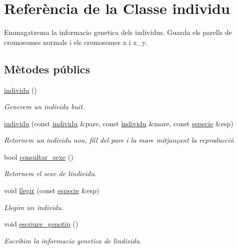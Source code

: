 \hypertarget{classindividu}{}\section{Referència de la Classe individu}
\label{classindividu}


Emmagatzema la informacio genetica dels individus. Guarda els parells de cromosomes normals i els cromosomes x i x\+\_\+y.  


\subsection*{Mètodes públics}
\begin{DoxyCompactItemize}
\item 
\hyperlink{classindividu_af1ba9dc86a04bff6b41ed2d1cf3202b9}{individu} ()
\begin{DoxyCompactList}\small\item\em Generem un individu buit. \end{DoxyCompactList}\item 
\hyperlink{classindividu_a433b5d0a4b5280d108d5f819391e59a6}{individu} (const \hyperlink{classindividu}{individu} \&pare, const \hyperlink{classindividu}{individu} \&mare, const \hyperlink{classespecie}{especie} \&esp)
\begin{DoxyCompactList}\small\item\em Retornem un individu nou, fill del pare i la mare mitjançant la reproducció \end{DoxyCompactList}\item 
bool \hyperlink{classindividu_a30ab21dfd66b20a748bcf41e0b3108a0}{consultar\+\_\+sexe} ()
\begin{DoxyCompactList}\small\item\em Retornem el sexe de l\textquotesingle{}individu. \end{DoxyCompactList}\item 
void \hyperlink{classindividu_a1bf8b627f733b55fe98a0fe6ac12898d}{llegir} (const \hyperlink{classespecie}{especie} \&esp)
\begin{DoxyCompactList}\small\item\em Llegim un individu. \end{DoxyCompactList}\item 
void \hyperlink{classindividu_a8e9d5b4698e9d2d1838e5a512206768a}{escriure\+\_\+genotip} ()
\begin{DoxyCompactList}\small\item\em Escribim la informacio genetica de l\textquotesingle{}individu. \end{DoxyCompactList}\end{DoxyCompactItemize}
